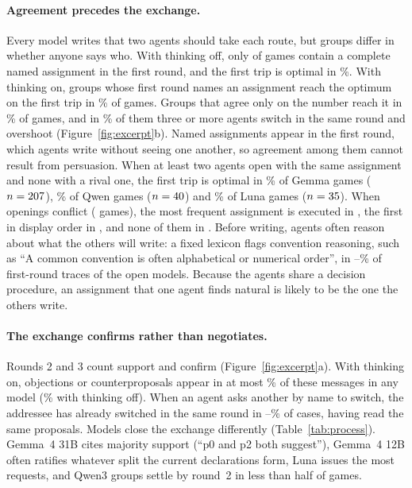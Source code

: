 \documentclass[11pt]{article}
\begin{document}
\paragraph{Agreement precedes the exchange.}
Every model writes that two agents should take each route, but groups differ in whether anyone says who. With thinking off, only \OffNamed{} of \OffGames{} games contain a complete named assignment in the first round, and the first trip is optimal in \OffTripOneSO\%. With thinking on, groups whose first round names an assignment reach the optimum on the first trip in \NamedSO\% of \NamedGames{} games. Groups that agree only on the number reach it in \UnnamedSO\% of \UnnamedGames{} games, and in \UnnamedOver\% of them three or more agents switch in the same round and overshoot (Figure~\ref{fig:excerpt}b). Named assignments appear in the first round, which agents write without seeing one another, so agreement among them cannot result from persuasion. When at least two agents open with the same assignment and none with a rival one, the first trip is optimal in \SameGemmaSO\% of Gemma games ($n=207$), \SameQwenSO\% of Qwen games ($n=40$) and \SameLunaSO\% of Luna games ($n=35$). When openings conflict (\ConflictN{} games), the most frequent assignment is executed in \ConflictModal, the first in display order in \ConflictFirst, and none of them in \ConflictNone. Before writing, agents often reason about what the others will write: a fixed lexicon flags convention reasoning, such as ``A common convention is often alphabetical or numerical order'', in \ConvCueLo--\ConvCueHi\% of \ConvTraces{} first-round traces of the open models. Because the agents share a decision procedure, an assignment that one agent finds natural is likely to be the one the others write.

\paragraph{The exchange confirms rather than negotiates.}
Rounds 2 and 3 count support and confirm (Figure~\ref{fig:excerpt}a). With thinking on, objections or counterproposals appear in at most \ObjMaxOnAll\% of these messages in any model (\ObjMaxAll\% with thinking off). When an agent asks another by name to switch, the addressee has already switched in the same round in \ReqMovedLo--\ReqMovedHi\% of cases, having read the same proposals. Models close the exchange differently (Table~\ref{tab:process}). Gemma~4 31B cites majority support (``p0 and p2 both suggest''), Gemma~4 12B often ratifies whatever split the current declarations form, Luna issues the most requests, and Qwen3 groups settle by round~2 in less than half of games.
\end{document}
